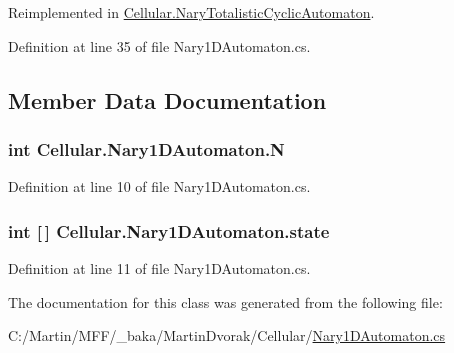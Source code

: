 Reimplemented in \hyperlink{class_cellular_1_1_nary_totalistic_cyclic_automaton_a422dbcbd3e3cd3efdccc21724e7c6b01}{Cellular.\+Nary\+Totalistic\+Cyclic\+Automaton}.



Definition at line 35 of file Nary1\+D\+Automaton.\+cs.



\subsection{Member Data Documentation}
\hypertarget{class_cellular_1_1_nary1_d_automaton_a1e499082e289666a6eb3d523d367ac1f}{}
\subsubsection[{N}]{\setlength{\rightskip}{0pt plus 5cm}int Cellular.\+Nary1\+D\+Automaton.\+N\hspace{0.3cm}{\ttfamily [protected]}}\label{class_cellular_1_1_nary1_d_automaton_a1e499082e289666a6eb3d523d367ac1f}


Definition at line 10 of file Nary1\+D\+Automaton.\+cs.

\hypertarget{class_cellular_1_1_nary1_d_automaton_a563eb68c941321814d9261d68eed63f3}{}
\subsubsection[{state}]{\setlength{\rightskip}{0pt plus 5cm}int \mbox{[}$\,$\mbox{]} Cellular.\+Nary1\+D\+Automaton.\+state\hspace{0.3cm}{\ttfamily [protected]}}\label{class_cellular_1_1_nary1_d_automaton_a563eb68c941321814d9261d68eed63f3}


Definition at line 11 of file Nary1\+D\+Automaton.\+cs.



The documentation for this class was generated from the following file\+:\begin{DoxyCompactItemize}
\item 
C\+:/\+Martin/\+M\+F\+F/\+\_\+baka/\+Martin\+Dvorak/\+Cellular/\hyperlink{_nary1_d_automaton_8cs}{Nary1\+D\+Automaton.\+cs}\end{DoxyCompactItemize}
